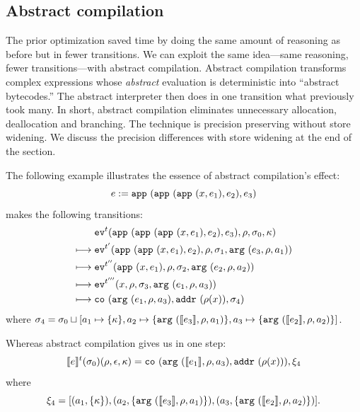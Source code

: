 \documentclass[preprint,onecolumn,9pt]{sigplanconf} %
\begin{document}

\subsection{Abstract compilation}

The prior optimization saved time by doing the same amount of
reasoning as before but in fewer transitions. We can exploit the same
idea---same reasoning, fewer transitions---with abstract
compilation. Abstract compilation transforms complex expressions whose
\emph{abstract} evaluation is deterministic into ``abstract
bytecodes.''  The abstract interpreter then does in one transition
what previously took many. In short, abstract compilation eliminates
unnecessary allocation, deallocation and branching. The technique is
precision preserving without store widening. We discuss the precision
differences with store widening at the end of the section.

The following example illustrates
the essence of abstract compilation's effect:
\[
\mexp := \sapp{\sapp{\sapp\mvar{\mexp_1}}{\mexp_2}}{\mexp_3}
\]
makes the following transitions:
\begin{align}
& \ev[^\mcntr]{\sapp{\sapp{\sapp\mvar{\mexp_1}}{\mexp_2}}{\mexp_3},\menv,\msto_0,\mkont}\\
\machstep\; &
\ev[^{\mcntr'}]{\sapp{\sapp\mvar{\mexp_1}}{\mexp_2},\menv,\msto_1,\kar{\mexp_3,\menv,\maddr_1}}
\\
\machstep\; &
\ev[^{\mcntr''}]{\sapp\mvar{\mexp_1},\menv,\msto_2,\kar{\mexp_2,\menv,\maddr_2}}
\\
\machstep\; &
\ev[^{\mcntr'''}]{\mvar, \menv,\msto_3,\kar{\mexp_1,\menv,\maddr_3}} %
\\
\machstep\; &
\spchoice
{\co{\kar{\mexp_1,\menv,\maddr_3},\saddr{\menv(\mvar)},\msto_4}}
{\co{\kar{\mexp_1,\menv,\maddr_{f3},\maddr_{a3},\maddr_3},\superposition{\msto_4(\menv(\mvar))},\msto_4}}
\end{align}
where \(
\msto_4 = \msto_0 \sqcup [\maddr_1 \mapsto \setof{\mkont},
\maddr_2 \mapsto \setof{\kar{\compile{\mexp_3},\menv,\maddr_1}},
\maddr_3 \mapsto \setof{\kar{\compile{\mexp_2},\menv,\maddr_2}}]\).

Whereas abstract compilation gives us in one step:
\begin{align*}
\compile{\mexp}^\mcntr(\msto_0)(\menv,\epsilon,\mkont) =
\spchoice
{\co{\kar{\compile{\mexp_1},\menv,\maddr_3},\saddr{\menv(\mvar)}},\msdiff_4}
{\co{\kar{\compile{\mexp_1},\menv,\maddr_{f3},\maddr_{a3},\maddr_3},\superposition{\msto'_4(\menv(\mvar))},\msto'_4}}
\end{align*}
where
\begin{equation*}
\msdiff_4 = [\ttuple{\maddr_1}{\setof{\mkont}},
             \ttuple{\maddr_2}{\setof{\kar{\compile{\mexp_3},\menv,\maddr_1}}},
             \ttuple{\maddr_3}{\setof{\kar{\compile{\mexp_2},\menv,\maddr_2}}}]\text.
\end{equation*}
\end{document}
